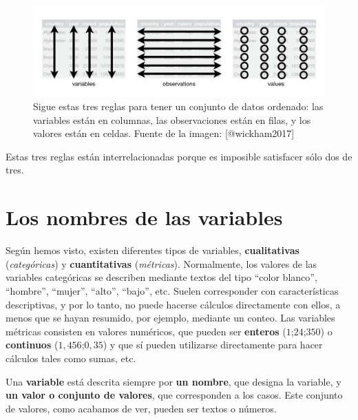 \documentclass[
  letterpaper,
  DIV=11,
  numbers=noendperiod,
  oneside]{scrreprt}
\begin{document}
\begin{figure}

{\centering \includegraphics{01-imagenes/tidy-1.png}

}

\caption{\label{fig-tidy1}Sigue estas tres reglas para tener un conjunto
de datos ordenado: las variables están en columnas, las observaciones
están en filas, y los valores están en celdas. Fuente de la imagen:
{[}@wickham2017{]}}

\end{figure}

Estas tres reglas están interrelacionadas porque es imposible satisfacer
sólo dos de tres.

\hypertarget{los-nombres-de-las-variables}{%
\section{Los nombres de las
variables}\label{los-nombres-de-las-variables}}

Según hemos visto, existen diferentes tipos de variables,
\textbf{cualitativas} (\emph{categóricas}) y \textbf{cuantitativas}
(\emph{métricas}). Normalmente, los valores de las variables categóricas
se describen mediante textos del tipo ``color blanco'', ``hombre'',
``mujer'', ``alto'', ``bajo'', etc. Suelen corresponder con
características descriptivas, y por lo tanto, no puede hacerse cálculos
directamente con ellos, a menos que se hayan resumido, por ejemplo,
mediante un conteo. Las variables métricas consisten en valores
numéricos, que pueden ser \textbf{enteros} (\(1\);\(24\);\(350\)) o
\textbf{continuos} (\(1,456\);\(0,35\)) y que sí pueden utilizarse
directamente para hacer cálculos tales como sumas, etc.

Una \textbf{variable} está descrita siempre por \textbf{un nombre}, que
designa la variable, y \textbf{un valor o conjunto de valores}, que
corresponden a los casos. Este conjunto de valores, como acabamos de
ver, pueden ser textos o números.

{}
\end{document}
